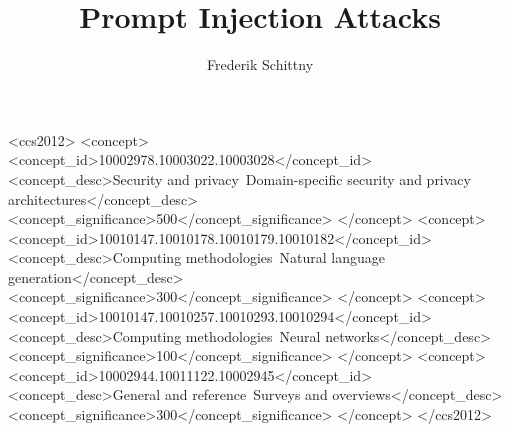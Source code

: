 
\usepackage{cleveref}

\usepackage{makecell}
\usepackage{multicol}
\usepackage{multirow}

\usepackage[htt]{hyphenat}

\usepackage{amsmath}

\acmDOI{}
\acmISBN{}



\title{Prompt Injection Attacks}

\author{Frederik Schittny}


\begin{CCSXML}
<ccs2012>
   <concept>
       <concept_id>10002978.10003022.10003028</concept_id>
       <concept_desc>Security and privacy~Domain-specific security and privacy architectures</concept_desc>
       <concept_significance>500</concept_significance>
       </concept>
   <concept>
       <concept_id>10010147.10010178.10010179.10010182</concept_id>
       <concept_desc>Computing methodologies~Natural language generation</concept_desc>
       <concept_significance>300</concept_significance>
       </concept>
   <concept>
       <concept_id>10010147.10010257.10010293.10010294</concept_id>
       <concept_desc>Computing methodologies~Neural networks</concept_desc>
       <concept_significance>100</concept_significance>
       </concept>
   <concept>
       <concept_id>10002944.10011122.10002945</concept_id>
       <concept_desc>General and reference~Surveys and overviews</concept_desc>
       <concept_significance>300</concept_significance>
       </concept>
 </ccs2012>
\end{CCSXML}

